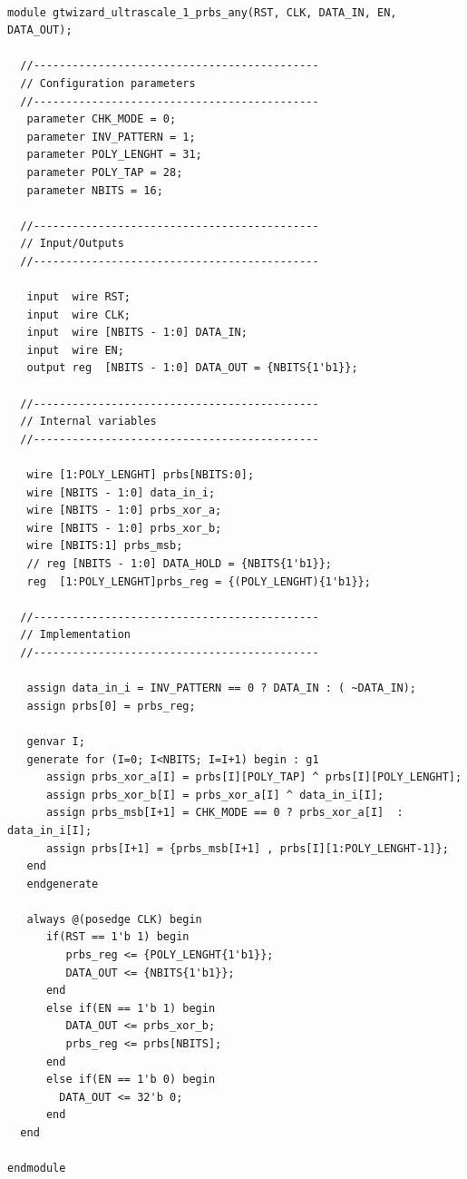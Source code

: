 \documentclass[oneside]{discothesis}
\begin{document}
\begin{verbatim}

module gtwizard_ultrascale_1_prbs_any(RST, CLK, DATA_IN, EN, DATA_OUT);

  //--------------------------------------------
  // Configuration parameters
  //--------------------------------------------
   parameter CHK_MODE = 0;
   parameter INV_PATTERN = 1;
   parameter POLY_LENGHT = 31;
   parameter POLY_TAP = 28;
   parameter NBITS = 16;

  //--------------------------------------------
  // Input/Outputs
  //--------------------------------------------

   input  wire RST;
   input  wire CLK;
   input  wire [NBITS - 1:0] DATA_IN;
   input  wire EN;
   output reg  [NBITS - 1:0] DATA_OUT = {NBITS{1'b1}};

  //--------------------------------------------
  // Internal variables
  //--------------------------------------------

   wire [1:POLY_LENGHT] prbs[NBITS:0];
   wire [NBITS - 1:0] data_in_i;
   wire [NBITS - 1:0] prbs_xor_a;
   wire [NBITS - 1:0] prbs_xor_b;
   wire [NBITS:1] prbs_msb;
   // reg [NBITS - 1:0] DATA_HOLD = {NBITS{1'b1}};
   reg  [1:POLY_LENGHT]prbs_reg = {(POLY_LENGHT){1'b1}};

  //--------------------------------------------
  // Implementation
  //--------------------------------------------

   assign data_in_i = INV_PATTERN == 0 ? DATA_IN : ( ~DATA_IN);
   assign prbs[0] = prbs_reg;

   genvar I;
   generate for (I=0; I<NBITS; I=I+1) begin : g1
      assign prbs_xor_a[I] = prbs[I][POLY_TAP] ^ prbs[I][POLY_LENGHT];
      assign prbs_xor_b[I] = prbs_xor_a[I] ^ data_in_i[I];
      assign prbs_msb[I+1] = CHK_MODE == 0 ? prbs_xor_a[I]  :  data_in_i[I];
      assign prbs[I+1] = {prbs_msb[I+1] , prbs[I][1:POLY_LENGHT-1]};
   end
   endgenerate

   always @(posedge CLK) begin
      if(RST == 1'b 1) begin
         prbs_reg <= {POLY_LENGHT{1'b1}};
         DATA_OUT <= {NBITS{1'b1}};
      end
      else if(EN == 1'b 1) begin
         DATA_OUT <= prbs_xor_b;
         prbs_reg <= prbs[NBITS];
      end
      else if(EN == 1'b 0) begin
        DATA_OUT <= 32'b 0;
      end
  end

endmodule
\end{verbatim}
\cleardoublepage
\end{document}
